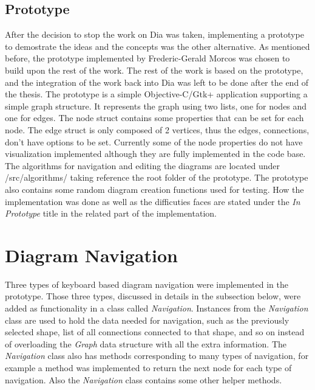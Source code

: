 \subsection{Prototype}
After the decision to stop the work on Dia was taken, implementing a prototype to demostrate the ideas and the concepts was the other alternative. As mentioned before, the prototype implemented by Frederic-Gerald Morcos was chosen to build upon the rest of the work. The rest of the work is based on the prototype, and the integration of the work back into Dia was left to be done after the end of the thesis. The prototype is a simple Objective-C/Gtk+ application supporting a simple graph structure. It represents the graph using two lists, one for nodes and one for edges. The node struct contains some properties that can be set for each node. The edge struct is only composed of 2 vertices, thus the edges, connections, don't have options to be set. Currently some of the node properties do not have visualization implemented although they are fully implemented in the code base. The algorithms for navigation and editing the diagrams are located under /src/algorithms/ taking reference the root folder of the prototype. The prototype also contains some random diagram creation functions used for testing.  How the implementation was done as well as the difficuties faces are stated under the {\it In Prototype} title in the related part of the implementation.


\section{Diagram Navigation}
Three types of keyboard based diagram navigation were implemented in the prototype. Those three types, discussed in details in the subsection below, were added as functionality in a class called {\it Navigation}. Instances from the {\it Navigation} class are used to hold the data needed for navigation, such as the previously selected shape, list of all connections connected to that shape, and so on instead of overloading the {\it Graph} data structure with all the extra information. The {\it Navigation} class also has methods corresponding to many types of navigation, for example a method was implemented to return the next node for each type of navigation. Also the {\it Navigation} class contains some other helper methods.

